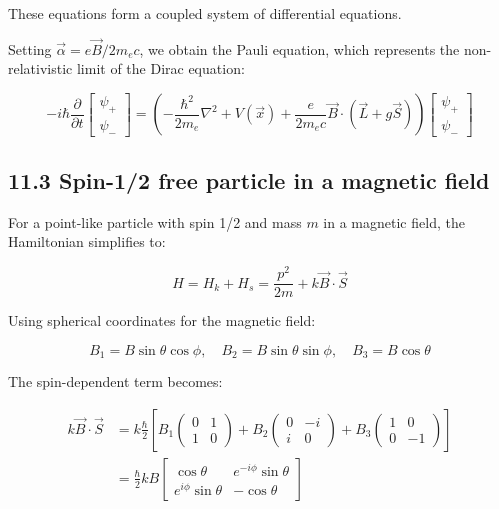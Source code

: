 \documentclass[10pt]{article}
\begin{document}
These equations form a coupled system of differential equations.

Setting $\vec{\alpha}=e \vec{B} / 2 m_{e} c$, we obtain the Pauli equation, which represents the non-relativistic limit of the Dirac equation:

\[
-i \hbar \frac{\partial}{\partial t}\left[\begin{array}{l}
\psi_{+}  \tag{11.26}\\
\psi_{-}
\end{array}\right]=\left(-\frac{\hbar^{2}}{2 m_{e}} \nabla^{2}+V(\vec{x})+\frac{e}{2 m_{e} c} \vec{B} \cdot(\vec{L}+g \vec{S})\right)\left[\begin{array}{l}
\psi_{+} \\
\psi_{-}
\end{array}\right]
\]

\subsection*{11.3 Spin-1/2 free particle in a magnetic field}
For a point-like particle with spin 1/2 and mass $m$ in a magnetic field, the Hamiltonian simplifies to:

\begin{equation*}
H=H_{k}+H_{s}=\frac{p^{2}}{2 m}+k \vec{B} \cdot \vec{S} \tag{11.27}
\end{equation*}

Using spherical coordinates for the magnetic field:

\begin{equation*}
B_{1}=B \sin \theta \cos \phi, \quad B_{2}=B \sin \theta \sin \phi, \quad B_{3}=B \cos \theta \tag{11.28}
\end{equation*}

The spin-dependent term becomes:

\begin{align*}
k \vec{B} \cdot \vec{S} &= k \frac{\hbar}{2}\left[B_{1}\left(\begin{array}{ll}
0 & 1 \\
1 & 0
\end{array}\right)+B_{2}\left(\begin{array}{cc}
0 & -i \\
i & 0
\end{array}\right)+B_{3}\left(\begin{array}{cc}
1 & 0 \\
0 & -1
\end{array}\right)\right] \\
&= \frac{\hbar}{2} k B\left[\begin{array}{cc}
\cos \theta & e^{-i \phi} \sin \theta \\
e^{i \phi} \sin \theta & -\cos \theta
\end{array}\right] \tag{11.29}
\end{align*}
\end{document}
